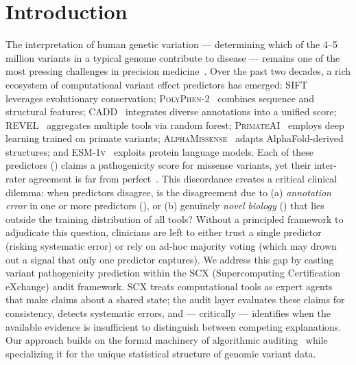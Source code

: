 \documentclass[11pt,a4paper]{article}
\theoremstyle{definition}
\newcommand{\SCX}{\textsc{SCX}}
\newcommand{\SIFT}{\textsc{SIFT}}
\newcommand{\PolyPhen}{\textsc{PolyPhen-2}}
\newcommand{\CADD}{\textsc{CADD}}
\newcommand{\REVEL}{\textsc{REVEL}}
\newcommand{\PrimateAI}{\textsc{PrimateAI}}
\newcommand{\AlphaMissense}{\textsc{AlphaMissense}}
\newcommand{\ESM}{\textsc{ESM-1v}}
\newcommand{\genome}{}
\newcommand{\novelbio}{}
\newcommand{\annobias}{}
\begin{document}
\section{Introduction}
The interpretation of human genetic variation — determining which of the 4--5 million variants in a typical genome contribute to disease — remains one of the most pressing challenges in precision medicine~\cite{karczewski2020mutational, richards2015standards}.
Over the past two decades, a rich ecosystem of computational variant effect predictors has emerged: \SIFT{}~\cite{ng2003sift} leverages evolutionary conservation; \PolyPhen{}~\cite{adzhubei2010method} combines sequence and structural features; \CADD{}~\cite{kircher2014general} integrates diverse annotations into a unified score; \REVEL{}~\cite{ioannidis2016revel} aggregates multiple tools via random forest; \PrimateAI{}~\cite{sundaram2018predicting} employs deep learning trained on primate variants; \AlphaMissense{}~\cite{cheng2023accurate} adapts AlphaFold-derived structures; and \ESM{}~\cite{meier2021language} exploits protein language models.
Each of these predictors (\genome{}) claims a pathogenicity score for missense variants, yet their inter-rater agreement is far from perfect~\cite{pejaver2022evidence}.
This discordance creates a critical clinical dilemma: when predictors disagree, is the disagreement due to (a) \textit{annotation error} in one or more predictors (\annobias{}), or (b) genuinely \textit{novel biology} (\novelbio{}) that lies outside the training distribution of all tools?
Without a principled framework to adjudicate this question, clinicians are left to either trust a single predictor (risking systematic error) or rely on ad-hoc majority voting (which may drown out a signal that only one predictor captures).
We address this gap by casting variant pathogenicity prediction within the \SCX{} (Supercomputing Certification eXchange) audit framework.
\SCX{} treats computational tools as expert agents that make claims about a shared state; the audit layer evaluates these claims for consistency, detects systematic errors, and — critically — identifies when the available evidence is insufficient to distinguish between competing explanations.
Our approach builds on the formal machinery of algorithmic auditing~\cite{metaxas2024algorithmic} while specializing it for the unique statistical structure of genomic variant data.
\end{document}
